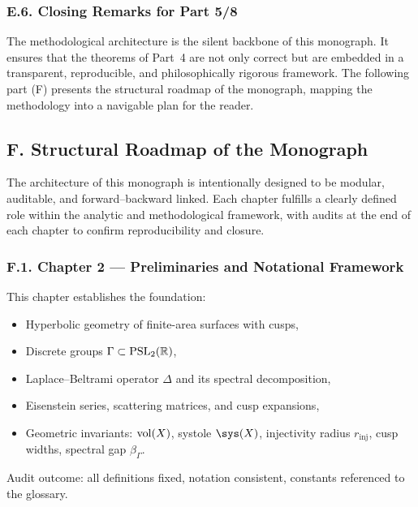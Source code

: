 \subsubsection*{E.6. Closing Remarks for Part 5/8}

The methodological architecture is the silent backbone of this monograph.
It ensures that the theorems of Part~4 are not only correct
but are embedded in a transparent, reproducible, and philosophically rigorous framework.
The following part (F) presents the structural roadmap of the monograph,
mapping the methodology into a navigable plan for the reader.


\subsection*{F. Structural Roadmap of the Monograph}
\label{sub:intro-roadmap}

The architecture of this monograph is intentionally designed to be
modular, auditable, and forward–backward linked.
Each chapter fulfills a clearly defined role within the analytic
and methodological framework, with audits at the end of each chapter
to confirm reproducibility and closure.

\subsubsection*{F.1. Chapter 2 — Preliminaries and Notational Framework}
This chapter establishes the foundation:
\begin{itemize}
  \item Hyperbolic geometry of finite-area surfaces with cusps,
  \item Discrete groups $\Gamma \subset \operatorname{PSL}_2(\mathbb{R})$,
  \item Laplace–Beltrami operator $\Delta$ and its spectral decomposition,
  \item Eisenstein series, scattering matrices, and cusp expansions,
  \item Geometric invariants: $\operatorname{vol}(X)$, systole $\sys(X)$,
        injectivity radius $r_{\mathrm{inj}}$, cusp widths, spectral gap $\beta_\Gamma$.
\end{itemize}
Audit outcome: all definitions fixed, notation consistent,
constants referenced to the glossary.

